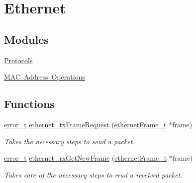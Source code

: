 \hypertarget{group__ethernet}{}\section{Ethernet}
\label{group__ethernet}
\subsection*{Modules}
\begin{DoxyCompactItemize}
\item 
\mbox{\hyperlink{group__protocols}{Protocols}}
\item 
\mbox{\hyperlink{group__mac__operations}{M\+A\+C Address Operations}}
\end{DoxyCompactItemize}
\subsection*{Functions}
\begin{DoxyCompactItemize}
\item 
\mbox{\hyperlink{group__error_gad3ae44be85fe6952dcaed425499e8f6b}{error\+\_\+t}} \mbox{\hyperlink{group__ethernet_ga65c7184e84b9d43ceb53481b6b3dedae}{ethernet\+\_\+tx\+Frame\+Request}} (\mbox{\hyperlink{group__ethernet_ga7519a7ae14b490659069435698d28a25}{ethernet\+Frame\+\_\+t}} $\ast$frame)
\begin{DoxyCompactList}\small\item\em Takes the necessary steps to send a packet. \end{DoxyCompactList}\item 
\mbox{\hyperlink{group__error_gad3ae44be85fe6952dcaed425499e8f6b}{error\+\_\+t}} \mbox{\hyperlink{group__ethernet_ga70be1735d8cd38033d7162e7d94d1eeb}{ethernet\+\_\+rx\+Get\+New\+Frame}} (\mbox{\hyperlink{group__ethernet_ga7519a7ae14b490659069435698d28a25}{ethernet\+Frame\+\_\+t}} $\ast$frame)
\begin{DoxyCompactList}\small\item\em Takes care of the necessary steps to read a received packet. \end{DoxyCompactList}\end{DoxyCompactItemize}
